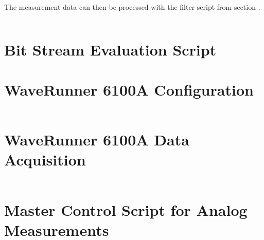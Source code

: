 The measurement data can then be processed with the filter script from section
.

\inputminted{shell}{code/measure--sigdel--1-3-11.sh}

\section{Bit Stream Evaluation Script}
\label{sec:app:bitstream:filter}

\section{WaveRunner 6100A Configuration}
\label{sec:app:waveRunner:acquire}
\inputminted{python}{code/configWaveRunner.py}

\section{WaveRunner 6100A Data Acquisition}
\label{sec:app:waveRunner:acquire}
\inputminted{python}{code/acquireWaveRunnerData.py}

\section{Master Control Script for Analog Measurements}
\label{sec:app:masterScript}
\inputminted{shell}{code/measure--gain01--1-1-3-11.sh}
